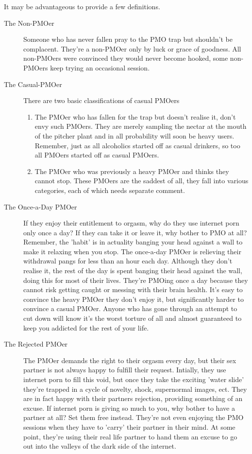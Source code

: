 \documentclass[easypeasy]{subfiles}
\begin{document}
It may be advantageous to provide a few definitions.
 \begin{description} 
   \item [The Non-PMOer] Someone who has never fallen pray to the PMO trap but shouldn't be complacent. They're a non-PMOer only by luck or grace of goodness. All non-PMOers were convinced they would never become hooked, some non-PMOers keep trying an occasional session.

   \item [The Casual-PMOer] There are two basic classifications of casual PMOers
\begin{enumerate}
\item The PMOer who has fallen for the trap but doesn't realise it, don't envy such PMOers. They are merely sampling the nectar at the mouth of the pitcher plant and in all probability will soon be heavy users. Remember, just as all alcoholics started off as casual drinkers, so too all PMOers started off as casual PMOers.

\item The PMOer who was previously a heavy PMOer and thinks they cannot stop. These PMOers are the saddest of all, they fall into various categories, each of which needs separate comment.
\end{enumerate}
    \item [The Once-a-Day PMOer] If they enjoy their entitlement to orgasm, why do they use internet porn only once a day? If they can take it or leave it, why bother to PMO at all? Remember, the 'habit' is in actuality banging your head against a wall to make it relaxing when you stop. The once-a-day PMOer is relieving their withdrawal pangs for less than an hour each day. Although they don't realise it, the rest of the day is spent banging their head against the wall, doing this for most of their lives. They're PMOing once a day because they cannot risk getting caught or messing with their brain health. It's easy to convince the heavy PMOer they don't enjoy it, but significantly harder to convince a casual PMOer. Anyone who has gone through an attempt to cut down will know it's the worst torture of all and almost guaranteed to keep you addicted for the rest of your life.

    \item [The Rejected PMOer] The PMOer demands the right to their orgasm every day, but their sex partner is not always happy to fulfill their request. Intially, they use internet porn to fill this void, but once they take the exciting 'water slide' they're trapped in a cycle of novelty, shock, supernormal images, ect. They are in fact happy with their partners rejection, providing something of an excuse. If internet porn is giving so much to you, why bother to have a partner at all? Set them free instead. They're not even enjoying the PMO sessions when they have to 'carry' their partner in their mind. At some point, they're using their real life partner to hand them an excuse to go out into the valleys of the dark side of the internet.


\end{description}
\end{document}
